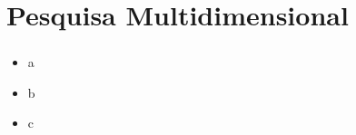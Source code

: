 \section{Pesquisa Multidimensional}

\begin{frame}
	\frametitle{}
	\begin{itemize}
		\item a
		\item b
		\item c
	\end{itemize}
\end{frame}
